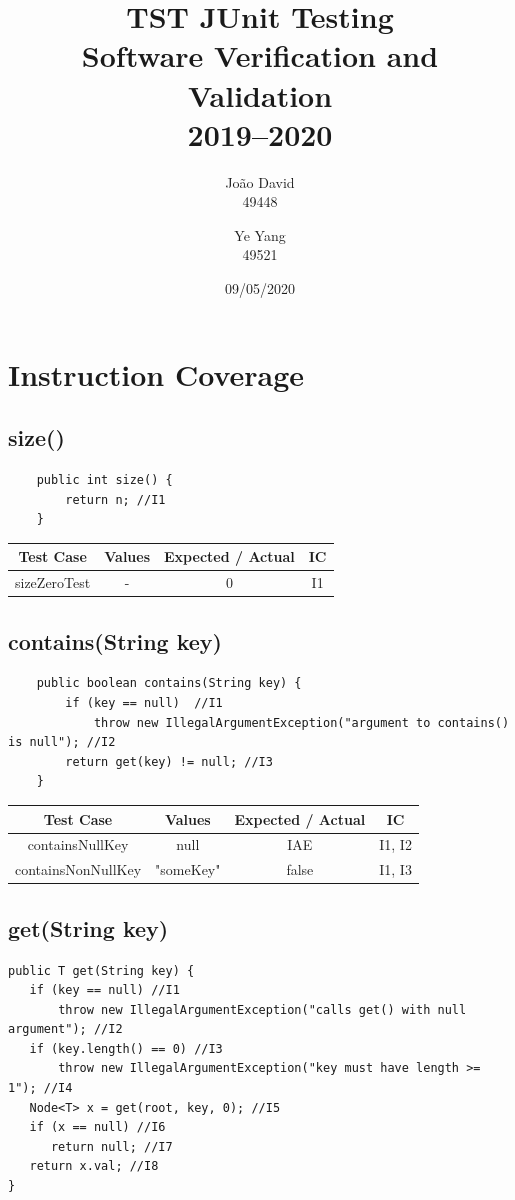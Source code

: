 \documentclass[12pt]{article}
\title{TST JUnit Testing \\
  \Large Software Verification and Validation \\ 2019--2020
}
\author{
  João David\\49448
  \and
  Ye Yang\\49521
}
\date{09/05/2020}
\begin{document}
\maketitle

\section{Instruction Coverage}
\subsection{size()}
\begin{lstlisting}
    public int size() {
        return n; //I1
    }
\end{lstlisting}

\begin{table}[htb]
\centering
\begin{tabular}{| c | c | c | c |} 
 \hline
 Test Case & Values & Expected / Actual & IC\\ \hline
 sizeZeroTest & - & 0 & I1 \\ \hline

\end{tabular}
\end{table}

\subsection{contains(String key)}
\begin{lstlisting}
    public boolean contains(String key) {
        if (key == null)  //I1
            throw new IllegalArgumentException("argument to contains() is null"); //I2
        return get(key) != null; //I3
    }
\end{lstlisting}

\begin{table}[htb]
\centering
\begin{tabular}{| c | c | c | c |} 
 \hline
 Test Case & Values & Expected / Actual & IC\\ \hline
 containsNullKey & null & IAE & I1, I2 \\ \hline
 containsNonNullKey & "someKey" & false & I1, I3 \\ \hline
\end{tabular}
\end{table}

\subsection{get(String key)}
\begin{lstlisting}
public T get(String key) {
   if (key == null) //I1
       throw new IllegalArgumentException("calls get() with null argument"); //I2
   if (key.length() == 0) //I3
       throw new IllegalArgumentException("key must have length >= 1"); //I4
   Node<T> x = get(root, key, 0); //I5
   if (x == null) //I6
      return null; //I7
   return x.val; //I8
}
\end{lstlisting}
\end{document}
